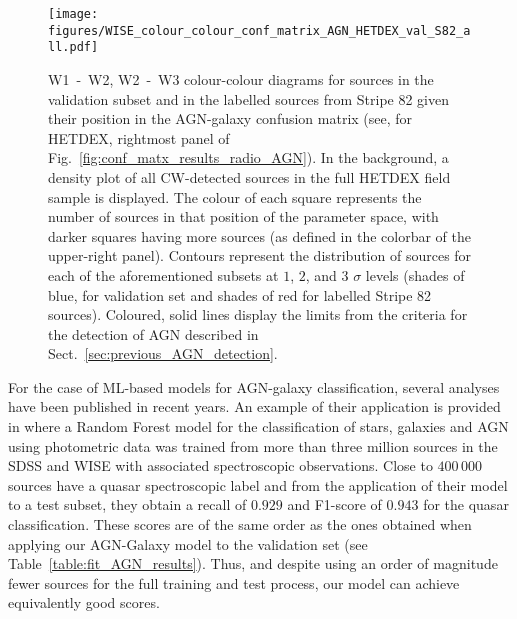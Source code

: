 \documentclass{aa}
\begin{document}
\begin{figure}
   \centering
   \texttt{[image: figures/WISE\_colour\_colour\_conf\_matrix\_AGN\_HETDEX\_val\_S82\_all.pdf]}
   \caption{W1~-~W2, W2~-~W3 colour-colour diagrams for sources in the validation subset and in the labelled sources from Stripe 82 given their position in the AGN-galaxy confusion matrix (see, for HETDEX, rightmost panel of Fig.~\ref{fig:conf_matx_results_radio_AGN}). In the background, a density plot of all CW-detected sources in the full HETDEX field sample is displayed. The colour of each square represents the number of sources in that position of the parameter space, with darker squares having more sources (as defined in the colorbar of the upper-right panel). Contours represent the distribution of sources for each of the aforementioned subsets at $1$, $2$, and $3$ $\sigma$ levels (shades of blue, for validation set and shades of red for labelled Stripe 82 sources). Coloured, solid lines display the limits from the criteria for the detection of AGN described in Sect.~\ref{sec:previous_AGN_detection}.}
   \label{fig:W1_W2_W2_W3_AGN_pred_HETDEX_S82}
\end{figure}


For the case of ML-based models for AGN-galaxy classification, several analyses have been published in recent years. An example of their application is provided in \citet{2020A&A...639A..84C} where a Random Forest model for the classification of stars, galaxies and AGN using photometric data was trained from more than three million sources in the SDSS \citep[DR15;][]{2019ApJS..240...23A} and WISE with associated spectroscopic observations. Close to $400\,000$ sources have a quasar spectroscopic label and from the application of their model to a test subset, they obtain a recall of $0.929$ and F1-score of $0.943$ for the quasar classification. These scores are of the same order as the ones obtained when applying our AGN-Galaxy model to the validation set (see Table~\ref{table:fit_AGN_results}). Thus, and despite using an order of magnitude fewer sources for the full training and test process, our model can achieve equivalently good scores. 
\end{document}
